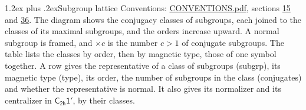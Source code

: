 \documentclass[10pt,a4paper]{article}
\makeatletter
\renewcommand\section{\@startsection{section}{1}{\z@}{-3ex plus -1ex minus -.2ex}%
  {1.2ex plus .2ex}{\normalfont\large\sffamily\bfseries\color{parttitle}}}
\numberwithin{equation}{section}
\newcommand{\grp}[1]{\mathsf{#1}}
\makeatother
\begin{document}
\section{Subgroup lattice}\label{s:subgroups}
Conventions: \href{../../CONVENTIONS.pdf}{CONVENTIONS.pdf}, sections \href{../../../rotation/CONVENTIONS.pdf\#conv.15}{15} and \href{../../CONVENTIONS.pdf\#conv.36}{36}.
The diagram shows the conjugacy classes of subgroups, each joined to the classes of its maximal subgroups, and the orders increase upward. \label{n:index.conjugates.c}A normal subgroup is framed, and ${\times}c$ is the number $c > 1$ of conjugate subgroups. The table lists the classes by order, then by magnetic type, those of one symbol together. \label{n:head.subgroup}\label{n:head.magnetic.type}\label{n:head.order}\label{n:head.conjugates}\label{n:head.normal}A row gives the representative of a class of subgroups (subgrp), its magnetic type (type), its order, the number of subgroups in the class (conjugates) and whether the representative is normal. \label{n:head.normalizer}\label{n:head.centralizer}It also gives its normalizer and its centralizer in $\grp{C_{2h}1'}$, by their classes. 
\end{document}
